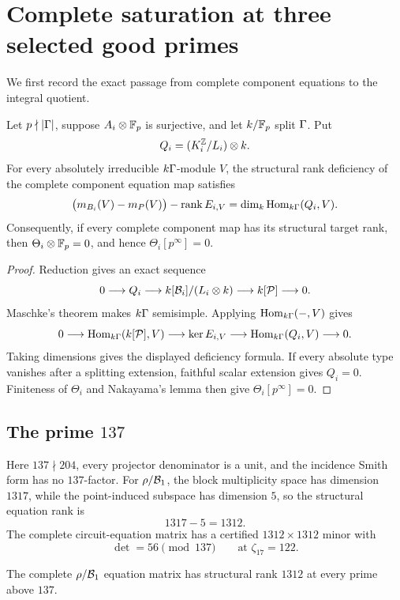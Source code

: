 \section{Complete saturation at three selected good primes}
\label{sec:selected-primes}

We first record the exact passage from complete component equations to the
integral quotient.

\begin{lemma}
\label{lem:good-prime}
Let \(p\nmid|\Gamma|\), suppose \(A_i\otimes\mathbb F_p\) is surjective, and
let \(k/\mathbb F_p\) split \(\Gamma\).  Put
\[
 Q_i=(K_i^{\mathbb Z}/L_i)\otimes k.
\]
For every absolutely irreducible \(k\Gamma\)-module \(V\), the
structural rank deficiency of the complete component equation map satisfies
\[
 \bigl(m_{B_i}(V)-m_P(V)\bigr)-\operatorname{rank} E_{i,V}
 =\dim_k\operatorname{Hom}_{k\Gamma}(Q_i,V).
\]
Consequently, if every complete component map has its structural target rank,
then
\(\Theta_i\otimes\mathbb F_p=0\), and hence \(\Theta_i[p^\infty]=0\).
\end{lemma}

\begin{proof}
Reduction gives an exact sequence
\[
 0\longrightarrow Q_i
 \longrightarrow k[\mathcal B_i]/(L_i\otimes k)
 \longrightarrow k[\mathcal P]\longrightarrow0.
\]
Maschke's theorem makes \(k\Gamma\) semisimple.  Applying
\(\operatorname{Hom}_{k\Gamma}(-,V)\) gives
\[
 0\longrightarrow\operatorname{Hom}_{k\Gamma}(k[\mathcal P],V)
 \longrightarrow\ker E_{i,V}
 \longrightarrow\operatorname{Hom}_{k\Gamma}(Q_i,V)
 \longrightarrow0.
\]
Taking dimensions gives the displayed deficiency formula.  If every absolute
type vanishes after a splitting extension, faithful scalar extension gives
\(Q_i=0\).
Finiteness of \(\Theta_i\) and Nakayama's lemma then give
\(\Theta_i[p^\infty]=0\).
\end{proof}

\subsection{The prime \(137\)}

Here \(137\nmid204\), every projector denominator is a unit, and the
incidence Smith form has no \(137\)-factor.  For \(\rho/\mathcal B_1\), the block
multiplicity space has dimension \(1317\), while the point-induced
subspace has dimension \(5\), so the structural equation rank is
\[
 1317-5=1312.
\]
The complete circuit-equation matrix has a certified
\(1312\times1312\) minor with
\[
 \det=56\pmod {137}
 \qquad\text{at }\zeta_{17}=122.
\]
\begin{theorem}
\label{thm:rho137}
The complete \(\rho/\mathcal B_1\) equation matrix has structural rank \(1312\)
at every prime above \(137\).
\end{theorem}

